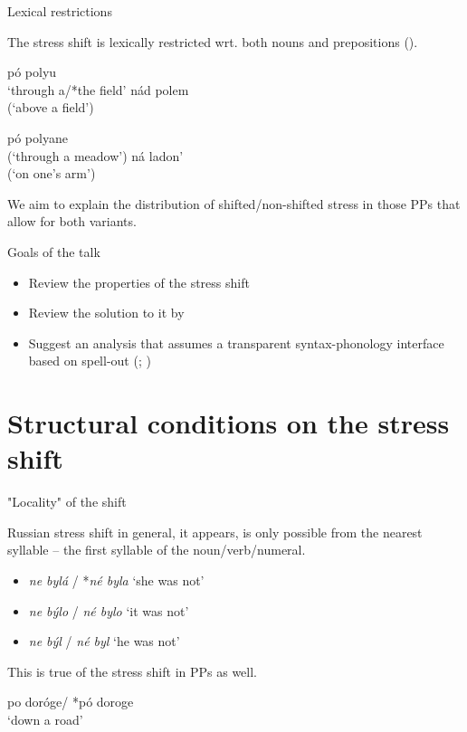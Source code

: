 \documentclass{beamer}
\begin{document}
	\begin{frame}{Lexical restrictions}
	
	The stress shift is lexically restricted wrt. both nouns and prepositions (\cite{Gribanova:2013}).
	
	\begin{minipage}{.49\textwidth}
		\pex\label{ex:basic1}
				\a pó polyu\\
				`through a/*the field'
				\a *nád polem\\
				(`above a field')
		\xe
		\end{minipage}
		\hfill
		\begin{minipage}{.5\textwidth}
		\pex\label{ex:basic2}
				\a *pó polyane\\
				(`through a meadow')
				\a *ná ladon’\\
				(`on one's arm')
		\xe
		\end{minipage}
		
	We aim to explain the distribution of shifted/non-shifted stress in those PPs that allow for both variants.
	
	\end{frame}

	\begin{frame}{Goals of the talk}

		\begin{itemize}
			\item Review the properties of the stress shift
			\item Review the solution to it by \textcite{Gribanova:2013}
			\item Suggest an analysis that assumes a transparent syntax-phonology interface based on spell-out (\cite{Scheer:2012}; \cite{Scheer:2016})
		\end{itemize}

	\end{frame}

	\section{Structural conditions on the stress shift}

	\begin{frame}{"Locality" of the shift}
	
	Russian stress shift in general, it appears, is only possible from the nearest syllable -- the first syllable of the noun/verb/numeral.
	
	\begin{itemize}
			\item \emph{ne bylá} / *\emph{né byla} `she was not' 
			\item \emph{ne býlo} / \emph{né bylo} `it was not' 
			\item \emph{ne býl} / \emph{né byl} `he was not' 
	\end{itemize}
	
	This is true of the stress shift in PPs as well.
	
		\ex
				po doróge/ *pó doroge\\
				`down a road'
		\xe
	
	\end{frame}
\end{document}
